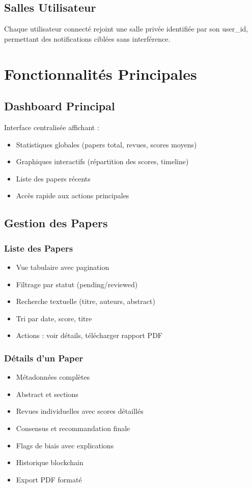 \documentclass[12pt,a4paper]{article}
\begin{document}
\subsection{Salles Utilisateur}

Chaque utilisateur connecté rejoint une salle privée identifiée par son user\_id, permettant des notifications ciblées sans interférence.

\section{Fonctionnalités Principales}

\subsection{Dashboard Principal}

Interface centralisée affichant :
\begin{itemize}
    \item Statistiques globales (papers total, revues, scores moyens)
    \item Graphiques interactifs (répartition des scores, timeline)
    \item Liste des papers récents
    \item Accès rapide aux actions principales
\end{itemize}

\subsection{Gestion des Papers}

\subsubsection{Liste des Papers}
\begin{itemize}
    \item Vue tabulaire avec pagination
    \item Filtrage par statut (pending/reviewed)
    \item Recherche textuelle (titre, auteurs, abstract)
    \item Tri par date, score, titre
    \item Actions : voir détails, télécharger rapport PDF
\end{itemize}

\subsubsection{Détails d'un Paper}
\begin{itemize}
    \item Métadonnées complètes
    \item Abstract et sections
    \item Revues individuelles avec scores détaillés
    \item Consensus et recommandation finale
    \item Flags de biais avec explications
    \item Historique blockchain
    \item Export PDF formaté
\end{itemize}
\end{document}
